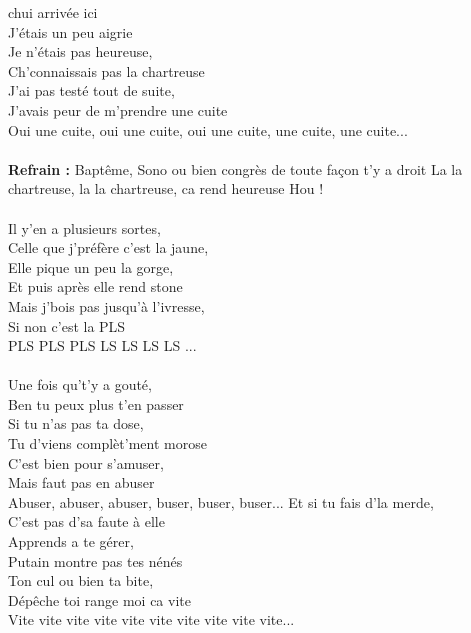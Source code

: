 
 chui arrivée ici
\\J'étais un peu aigrie
\\Je n'étais pas heureuse,
\\Ch'connaissais pas la chartreuse
\\J'ai pas testé tout de suite, 
\\J'avais peur de m'prendre une cuite
\\Oui une cuite, oui une cuite, oui une cuite, une cuite, une cuite...
\\\\\textbf{Refrain :}
{Baptême, Sono ou bien congrès de toute façon t'y a droit}
La la chartreuse, la la chartreuse, ca rend heureuse Hou !~~ \bissimple
\\\\Il y'en a plusieurs sortes, 
\\Celle que j'préfère c'est la jaune,
\\Elle pique un peu la gorge, 
\\Et puis après elle rend stone
\\Mais j'bois pas jusqu'à l'ivresse, 
\\Si non c'est la PLS
\\PLS PLS PLS LS LS LS LS ...
\\\\Une fois qu't'y a gouté, 
\\Ben tu peux plus t'en passer
\\Si tu n'as pas ta dose, 
\\Tu d'viens complèt'ment morose
\\C'est bien pour s'amuser, 
\\Mais faut pas en abuser
\\Abuser, abuser, abuser, buser, buser, buser...
\breakpage
Et si tu fais d'la merde, 
\\C'est pas d'sa faute à elle
\\Apprends a te gérer, 
\\Putain montre pas tes nénés
\\Ton cul ou bien ta bite, 
\\Dépêche toi range moi ca vite
\\Vite vite vite vite vite vite vite vite vite vite...
